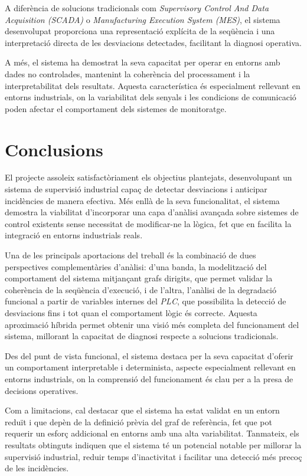 A diferència de solucions tradicionals com \textit{Supervisory Control And Data Acquisition (SCADA)} o \textit{Manufacturing Execution System (MES)}, el sistema desenvolupat proporciona una representació explícita de la seqüència i una interpretació directa de les desviacions detectades, facilitant la diagnosi operativa.

A més, el sistema ha demostrat la seva capacitat per operar en entorns amb dades no controlades, mantenint la coherència del processament i la interpretabilitat dels resultats. Aquesta característica és especialment rellevant en entorns industrials, on la variabilitat dels senyals i les condicions de comunicació poden afectar el comportament dels sistemes de monitoratge.

\section*{Conclusions}
El projecte assoleix satisfactòriament els objectius plantejats, desenvolupant un sistema de supervisió industrial capaç de detectar desviacions i anticipar incidències de manera efectiva. Més enllà de la seva funcionalitat, el sistema demostra la viabilitat d’incorporar una capa d’anàlisi avançada sobre sistemes de control existents sense necessitat de modificar-ne la lògica, fet que en facilita la integració en entorns industrials reals.

Una de les principals aportacions del treball és la combinació de dues perspectives complementàries d’anàlisi: d’una banda, la modelització del comportament del sistema mitjançant grafs dirigits, que permet validar la coherència de la seqüència d’execució, i de l’altra, l’anàlisi de la degradació funcional a partir de variables internes del \textit{PLC}, que possibilita la detecció de desviacions fins i tot quan el comportament lògic és correcte. Aquesta aproximació híbrida permet obtenir una visió més completa del funcionament del sistema, millorant la capacitat de diagnosi respecte a solucions tradicionals.

Des del punt de vista funcional, el sistema destaca per la seva capacitat d’oferir un comportament interpretable i determinista, aspecte especialment rellevant en entorns industrials, on la comprensió del funcionament és clau per a la presa de decisions operatives.

Com a limitacions, cal destacar que el sistema ha estat validat en un entorn reduït i que depèn de la definició prèvia del graf de referència, fet que pot requerir un esforç addicional en entorns amb una alta variabilitat. Tanmateix, els resultats obtinguts indiquen que el sistema té un potencial notable per millorar la supervisió industrial, reduir temps d’inactivitat i facilitar una detecció més precoç de les incidències.

